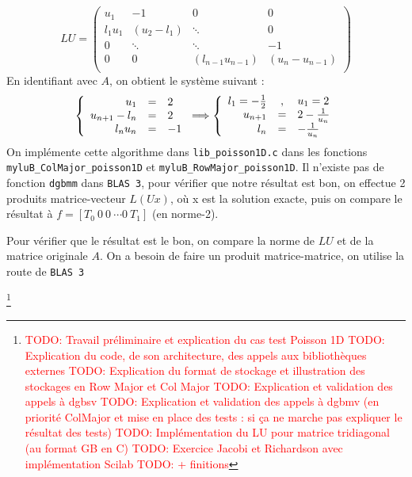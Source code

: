\documentclass{article}
\begin{document}
\[
	LU = 
	\begin{pmatrix}
			u_1		& 	-1		&	0				& 0		\\
			l_1 u_1	&	(u_2-l_1)	&\ddots				& 0		\\
			0		& 	\ddots	&\ddots				& -1	\\
			0		& 	0		& (l_{n-1} u_{n-1}) 	& (u_n-u_{n-1})	\\
	\end{pmatrix}
\]
En identifiant avec $A$, on obtient le système suivant :
\[
	\left \{
	\begin{array}{r c l}
		u_1 & = & 2 \\
		u_{n+1} - l_n & = & 2 \\
		l_n u_n & = & -1
	\end{array}
	\right .
	\Longrightarrow
	\left \{
	\begin{array}{r c l}
		l_1 = -\frac{1}{2} & , & u_1 = 2 \\
		u_{n+1} & = & 2 - \frac{1}{u_n} \\
		l_n & = & -\frac{1}{u_n}
	\end{array}
	\right .
\]
On implémente cette algorithme dans \texttt{lib\_poisson1D.c} dans les fonctions \texttt{myluB\_ColMajor\_poisson1D} et \texttt{myluB\_RowMajor\_poisson1D}. Il n'existe pas de fonction \texttt{dgbmm} dans \texttt{BLAS 3}, pour vérifier que notre résultat est bon, on effectue 2 produits matrice-vecteur \(L(Ux)\), où x est la solution exacte, puis on compare le résultat à \(f = \left[T_0\ 0\ 0\ \cdots 0\ T_1\right]\) (en norme-2).


Pour vérifier que le résultat est le bon, on compare la norme de \(LU\) et de la matrice originale $A$. On a besoin de faire un produit matrice-matrice, on utilise la route de \texttt{BLAS 3} 



\footnote{\textcolor{red}{TODO: Travail préliminaire et explication du cas test Poisson 1D}\newline
\textcolor{red}{TODO: Explication du code, de son architecture, des appels aux bibliothèques externes}\newline
\textcolor{red}{TODO: Explication du format de stockage et illustration des stockages en Row Major et Col Major}\newline
\textcolor{red}{TODO: Explication et validation des appels à dgbsv}\newline
\textcolor{red}{TODO: Explication et validation des appels à dgbmv (en priorité ColMajor et mise en place des tests : si ça ne marche pas expliquer le résultat des tests)}\newline
\textcolor{red}{TODO: Implémentation du LU pour matrice tridiagonal (au format GB en C)}\newline
\textcolor{red}{TODO: Exercice Jacobi et Richardson avec implémentation Scilab}\newline
\textcolor{red}{TODO: + finitions}}
\end{document}
